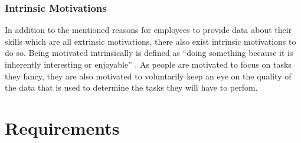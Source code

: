\subsubsection{Intrinsic Motivations}
In addition to the mentioned reasons for employees to provide data about their skills which are all extrinsic motivations,
there also exist intrinsic motivations to do so. Being motivated intrinsically is defined as ``doing something because it is inherently interesting or enjoyable'' \cite{RYAN200054}. As people are motivated to focus on tasks they fancy, they are also motivated to voluntarily keep an eye on the quality of the data that is used to determine the tasks they will have to perfom.


\section{Requirements}
